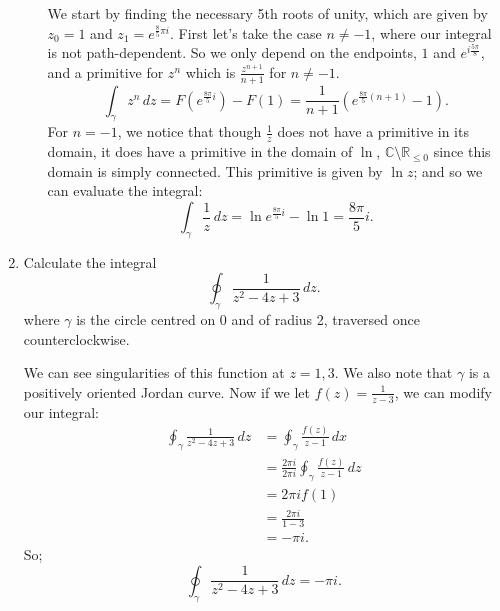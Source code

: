 \documentclass{article}
\begin{document}
\begin{enumerate}
\begin{enumerate}[label= (\alph*)]
We start by finding the necessary 5th roots of unity, which are given by $z_0=1$ and $z_1=e^{\frac{8}{5}\pi i}$. First let's take the case $n\neq -1$, where our integral is not path-dependent. So we only depend on the endpoints, $1$ and $e^{i\frac{5\pi}{8}}$, and a primitive for $z^{n}$ which is $\frac{z^{n+1}}{n+1}$ for $n\neq -1$.
\[
    \int_{\gamma} z^{n} \, dz=F(e^{\frac{8\pi}{5}i})-F(1)=\frac{1}{n+1}\left( e^{\frac{8\pi}{5}(n+1)}-1 \right) 
.\] 
For $n=-1$, we notice that though $\frac{1}{z}$ does not have a primitive in its domain, it does have
a primitive in the domain of $\ln$, $\mathbb{C}\setminus\mathbb{R}_{\leq 0}$ since this domain is simply connected. This primitive is given by $\ln z$; and so we can evaluate the integral:
\[
\int_{\gamma}^{} \frac{1}{z} \, dz  =\ln e^{\frac{8\pi}{5}i}- \ln 1=\frac{8\pi}{5}i
.\] 

\end{enumerate} 

\newpage

\item Calculate the integral
    \[
    \oint_{\gamma} \frac{1}{z^2-4z+3} \, dz 
    .\] 
where $\gamma$ is the circle centred on 0 and of radius 2, traversed once counterclockwise.

We can see singularities of this function at $z=1,3$. We also note that $\gamma$ is a positively oriented Jordan curve. Now if we let $f(z)=\frac{1}{z-3}$,
we can modify our integral:
\begin{align*}
    \oint_{\gamma} \frac{1}{z^2-4z+3} \, d z&= \oint_{\gamma} \frac{f(z)}{z-1} \, d x  \\ 
    &=\frac{2\pi i}{2\pi i} \oint_{\gamma} \frac{f(z)}{z-1} \, d z  \\
    &= 2\pi i f(1) \\
    &= \frac{2\pi i}{1-3} \\
    &= -\pi i
.\end{align*}
So;
\[
    \oint_{\gamma} \frac{1}{z^2-4z+3} \, dz = -\pi i
.\] 

\end{enumerate}
\end{document}
